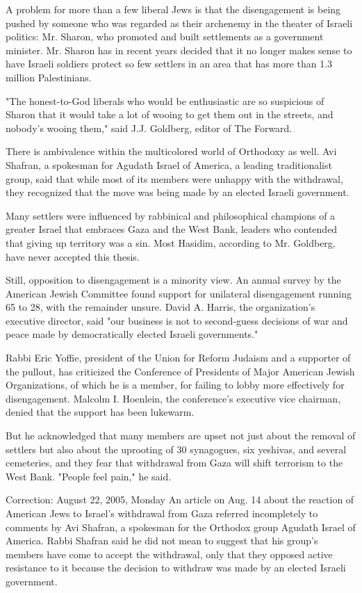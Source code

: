 A problem for more than a few liberal Jews is that the disengagement is
being pushed by someone who was regarded as their archenemy in the
theater of Israeli politics: Mr. Sharon, who promoted and built
settlements as a government minister. Mr. Sharon has in recent years
decided that it no longer makes sense to have Israeli soldiers protect
so few settlers in an area that has more than 1.3 million Palestinians.

"The honest-to-God liberals who would be enthusiastic are so suspicious
of Sharon that it would take a lot of wooing to get them out in the
streets, and nobody's wooing them," said J.J. Goldberg, editor of The
Forward.

There is ambivalence within the multicolored world of Orthodoxy as well.
Avi Shafran, a spokesman for Agudath Israel of America, a leading
traditionalist group, said that while most of its members were unhappy
with the withdrawal, they recognized that the move was being made by an
elected Israeli government.

Many settlers were influenced by rabbinical and philosophical champions
of a greater Israel that embraces Gaza and the West Bank, leaders who
contended that giving up territory was a sin. Most Hasidim, according to
Mr. Goldberg, have never accepted this thesis.

Still, opposition to disengagement is a minority view. An annual survey
by the American Jewish Committee found support for unilateral
disengagement running 65 to 28, with the remainder unsure. David A.
Harris, the organization's executive director, said "our business is not
to second-guess decisions of war and peace made by democratically
elected Israeli governments."

Rabbi Eric Yoffie, president of the Union for Reform Judaism and a
supporter of the pullout, has criticized the Conference of Presidents of
Major American Jewish Organizations, of which he is a member, for
failing to lobby more effectively for disengagement. Malcolm I.
Hoenlein, the conference's executive vice chairman, denied that the
support has been lukewarm.

But he acknowledged that many members are upset not just about the
removal of settlers but also about the uprooting of 30 synagogues, six
yeshivas, and several cemeteries, and they fear that withdrawal from
Gaza will shift terrorism to the West Bank. "People feel pain," he said.

Correction: August 22, 2005, Monday An article on Aug. 14 about the
reaction of American Jews to Israel's withdrawal from Gaza referred
incompletely to comments by Avi Shafran, a spokesman for the Orthodox
group Agudath Israel of America. Rabbi Shafran said he did not mean to
suggest that his group's members have come to accept the withdrawal,
only that they opposed active resistance to it because the decision to
withdraw was made by an elected Israeli government.

